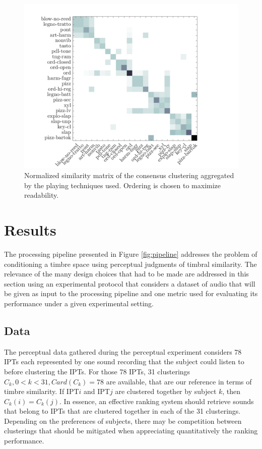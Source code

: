 \documentclass{bmcart}
\newcommand{\ipt}{IPT\xspace}
\newcommand{\ipts}{IPTs\xspace}
\begin{document}
\begin{figure}
\center
\includegraphics[width = \textwidth]{figures/consensusVsPt.png}
\caption{Normalized similarity matrix of the consensus clustering aggregated by the playing techniques used. Ordering is chosen to maximize readability.}
\label{fig:consensusVsPt}
\end{figure}

\section*{Results}
\label{sec:results}

The processing pipeline presented in Figure \ref{fig:pipeline} addresses the problem of conditioning a timbre space using perceptual judgments of timbral similarity. The relevance of the many design choices that had to be made  are addressed in this section using an experimental protocol that considers a dataset of audio that will be given as input to the processing pipeline and one metric used for evaluating its performance under a given experimental setting.

\subsection*{Data}

The perceptual data gathered during the perceptual experiment considers 78 \ipts each represented by one sound recording that the subject could listen to before clustering the \ipts. For those 78 \ipts, 31 clusterings $C_k, 0<k<31, Card(C_k)=78$ are available, that are our reference in terms of timbre similarity. If \ipt $i$ and \ipt $j$ are clustered together by subject $k$, then $C_k(i)=C_k(j)$. In essence, an effective ranking system should retrieve sounds that belong to \ipts that are clustered together in each of the 31 clusterings. Depending on the preferences of subjects, there may be competition between clusterings that should be mitigated when appreciating quantitatively the ranking performance.
\end{document}
